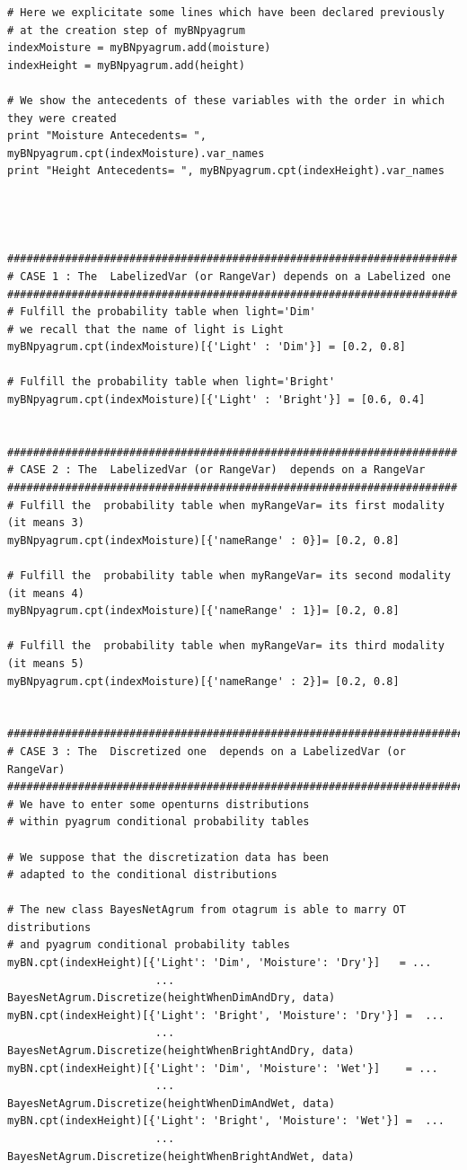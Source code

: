 \begin{lstlisting}
# Here we explicitate some lines which have been declared previously
# at the creation step of myBNpyagrum
indexMoisture = myBNpyagrum.add(moisture)
indexHeight = myBNpyagrum.add(height)

# We show the antecedents of these variables with the order in which they were created
print "Moisture Antecedents= ", myBNpyagrum.cpt(indexMoisture).var_names
print "Height Antecedents= ", myBNpyagrum.cpt(indexHeight).var_names




######################################################################
# CASE 1 : The  LabelizedVar (or RangeVar) depends on a Labelized one
######################################################################
# Fulfill the probability table when light='Dim'
# we recall that the name of light is Light
myBNpyagrum.cpt(indexMoisture)[{'Light' : 'Dim'}] = [0.2, 0.8]

# Fulfill the probability table when light='Bright'
myBNpyagrum.cpt(indexMoisture)[{'Light' : 'Bright'}] = [0.6, 0.4]


######################################################################
# CASE 2 : The  LabelizedVar (or RangeVar)  depends on a RangeVar 
######################################################################
# Fulfill the  probability table when myRangeVar= its first modality (it means 3)
myBNpyagrum.cpt(indexMoisture)[{'nameRange' : 0}]= [0.2, 0.8]

# Fulfill the  probability table when myRangeVar= its second modality (it means 4)
myBNpyagrum.cpt(indexMoisture)[{'nameRange' : 1}]= [0.2, 0.8]

# Fulfill the  probability table when myRangeVar= its third modality (it means 5)
myBNpyagrum.cpt(indexMoisture)[{'nameRange' : 2}]= [0.2, 0.8]


########################################################################
# CASE 3 : The  Discretized one  depends on a LabelizedVar (or RangeVar)
########################################################################
# We have to enter some openturns distributions 
# within pyagrum conditional probability tables

# We suppose that the discretization data has been 
# adapted to the conditional distributions

# The new class BayesNetAgrum from otagrum is able to marry OT distributions 
# and pyagrum conditional probability tables
myBN.cpt(indexHeight)[{'Light': 'Dim', 'Moisture': 'Dry'}]   = ...
                       ... BayesNetAgrum.Discretize(heightWhenDimAndDry, data)
myBN.cpt(indexHeight)[{'Light': 'Bright', 'Moisture': 'Dry'}] =  ...
                       ... BayesNetAgrum.Discretize(heightWhenBrightAndDry, data)
myBN.cpt(indexHeight)[{'Light': 'Dim', 'Moisture': 'Wet'}]    = ...
                       ...  BayesNetAgrum.Discretize(heightWhenDimAndWet, data)
myBN.cpt(indexHeight)[{'Light': 'Bright', 'Moisture': 'Wet'}] =  ...
                       ... BayesNetAgrum.Discretize(heightWhenBrightAndWet, data)
\end{lstlisting}




